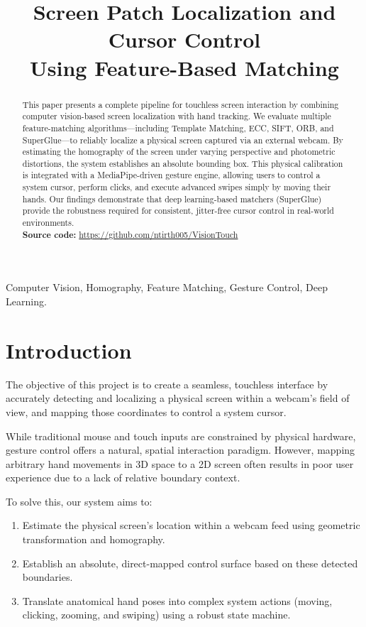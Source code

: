 \documentclass[conference]{IEEEtran}
\title{Screen Patch Localization and Cursor Control\\
Using Feature-Based Matching}
\author{
\IEEEauthorblockN{Naumisharanya Tirth}
\IEEEauthorblockA{Computer Science and Engineering\\
Indian Institute of Information Technology Raichur\\
Email: cs23b1050@iiitr.ac.in}
}
\begin{document}
\maketitle

\begin{abstract}
This paper presents a complete pipeline for touchless screen interaction by combining computer vision-based screen localization with hand tracking. We evaluate multiple feature-matching algorithms---including Template Matching, ECC, SIFT, ORB, and SuperGlue---to reliably localize a physical screen captured via an external webcam. By estimating the homography of the screen under varying perspective and photometric distortions, the system establishes an absolute bounding box. This physical calibration is integrated with a MediaPipe-driven gesture engine, allowing users to control a system cursor, perform clicks, and execute advanced swipes simply by moving their hands. Our findings demonstrate that deep learning-based matchers (SuperGlue) provide the robustness required for consistent, jitter-free cursor control in real-world environments. \\ \textbf{Source code:} \url{https://github.com/ntirth005/VisionTouch}
\end{abstract}


\begin{IEEEkeywords}
Computer Vision, Homography, Feature Matching, Gesture Control, Deep Learning.
\end{IEEEkeywords}

\section{Introduction}

The objective of this project is to create a seamless, touchless interface by accurately detecting and localizing a physical screen within a webcam's field of view, and mapping those coordinates to control a system cursor. 

While traditional mouse and touch inputs are constrained by physical hardware, gesture control offers a natural, spatial interaction paradigm. However, mapping arbitrary hand movements in 3D space to a 2D screen often results in poor user experience due to a lack of relative boundary context. 

To solve this, our system aims to:
\begin{enumerate}[noitemsep]
    \item Estimate the physical screen's location within a webcam feed using geometric transformation and homography.
    \item Establish an absolute, direct-mapped control surface based on these detected boundaries.
    \item Translate anatomical hand poses into complex system actions (moving, clicking, zooming, and swiping) using a robust state machine.
\end{enumerate}
\end{document}
